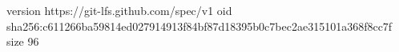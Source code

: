 version https://git-lfs.github.com/spec/v1
oid sha256:c611266ba59814ed027914913f84bf87d18395b0c7bec2ae315101a368f8cc7f
size 96
